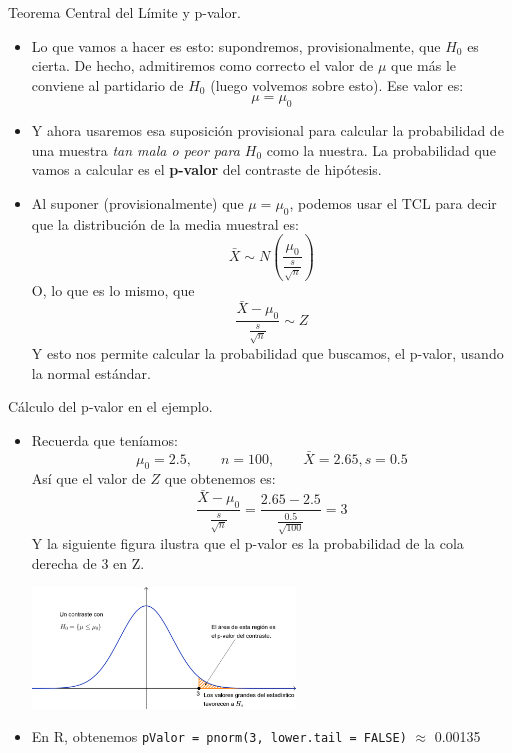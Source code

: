 \documentclass[
  9pt,
  ignorenonframetext,
]{beamer}
\begin{document}
\begin{frame}{Teorema Central del Límite y p-valor.}
\protect\hypertarget{teorema-central-del-limite-y-p-valor.}{}

\begin{itemize}
\item
  Lo que vamos a hacer es esto: supondremos, provisionalmente, que
  \(H_0\) es cierta. De hecho, admitiremos como correcto el valor de
  \(\mu\) que más le conviene al partidario de \(H_0\) (luego volvemos
  sobre esto). Ese valor es: \[\mu = \mu_0\]
\item
  Y ahora usaremos esa suposición provisional para calcular la
  probabilidad de una muestra \emph{tan mala o peor para \(H_0\)} como
  la nuestra. La probabilidad que vamos a calcular es el
  \textbf{p-valor} del contraste de hipótesis.
\item
  Al suponer (provisionalmente) que \(\mu = \mu_0\), podemos usar el TCL
  para decir que la distribución de la media muestral es: \[
  \bar X \sim N\left(\dfrac{\mu_0}{\frac{s}{\sqrt{n}}}\right)
  \] O, lo que es lo mismo, que \[
  \dfrac{\bar X - \mu_0}{\frac{s}{\sqrt{n}}}\sim Z
  \] Y esto nos permite calcular la probabilidad que buscamos, el
  p-valor, usando la normal estándar.
\end{itemize}

\end{frame}

\begin{frame}[fragile]{Cálculo del p-valor en el ejemplo.}
\protect\hypertarget{calculo-del-p-valor-en-el-ejemplo.}{}

\begin{itemize}
\item
  Recuerda que teníamos: \[
  \mu_0 = 2.5,\qquad n = 100,\qquad \bar X = 2.65, s = 0.5 
  \] Así que el valor de \(Z\) que obtenemos es: \[
  \dfrac{\bar X - \mu_0}{\frac{s}{\sqrt{n}}} = 
  \dfrac{2.65 - 2.5}{\frac{0.5}{\sqrt{100}}} = 3
  \] Y la siguiente figura ilustra que el p-valor es la probabilidad de
  la cola derecha de 3 en Z.

  \begin{center}\includegraphics[width=7cm]{../fig/07-01-PValorEjemploCanguros} \end{center}
\item
  En R, obtenemos \texttt{pValor\ =\ pnorm(3,\ lower.tail\ =\ FALSE)}
  \(\approx\) 0.00135
\end{itemize}

\end{frame}
\end{document}
